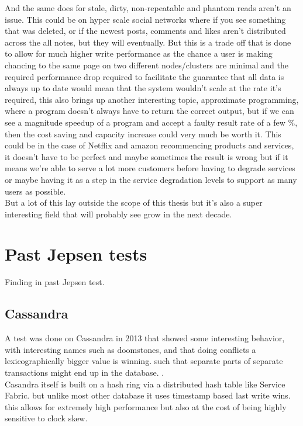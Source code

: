 \documentclass[a4paper,10pt,titlepage]{report}
\begin{document}
    And the same does for stale, dirty, non-repeatable and phantom reads aren't an issue. This could be on hyper scale social networks where if you see something that was deleted, or if the newest posts, comments and likes aren't distributed across the all notes, but they will eventually. But this is a trade off that is done to allow for much higher write performance as the chance a user is making chancing to the same page on two different nodes/clusters are minimal and the required performance drop required to facilitate the guarantee that all data is always up to date would mean that the system wouldn't scale at the rate it's required, this also brings up another interesting topic, approximate programming, where a program doesn't always have to return the correct output, but if we can see a magnitude speedup of a program and accept a faulty result rate of a few \%, then the cost saving and capacity increase could very much be worth it. This could be in the case of Netflix and amazon recommencing products and services, it doesn't have to be perfect and maybe sometimes the result is wrong but if it means we're able to serve a lot more customers before having to degrade services or maybe having it as a step in the service degradation levels to support as many users as possible. \\
    \vspace{5mm}
    But a lot of this lay outside the scope of this thesis but it's also a super interesting field that will probably see grow in the next decade.


    \section{Past Jepsen tests}
        Finding in past Jepsen test.
    \subsection{Cassandra}
    A test was done on Cassandra in 2013 that showed some interesting behavior, with interesting names such as doomstones, and that doing conflicts a lexicographically bigger value is winning. such that separate parts of separate transactions might end up in the database. .\\
    \vspace{5mm}
    Casandra itself is built on a hash ring via a distributed hash table like Service Fabric. but unlike most other database it uses timestamp based last write wins. this allows for extremely high performance but also at the cost of being highly sensitive to clock skew.\\
    
\end{document}
